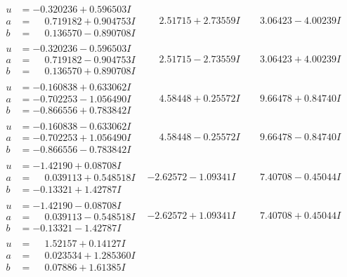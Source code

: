 \documentclass[1p]{elsarticle_modified}
\theoremstyle{definition}
\begin{document}
$$\begin{array}{c|c|c}
\begin{aligned}
u &= -0.320236 + 0.596503 I \\
a &= \phantom{-}0.719182 + 0.904753 I \\
b &= \phantom{-}0.136570 - 0.890708 I\end{aligned}
 & \phantom{-}2.51715 + 2.73559 I & \phantom{-}3.06423 - 4.00239 I \\ \hline\begin{aligned}
u &= -0.320236 - 0.596503 I \\
a &= \phantom{-}0.719182 - 0.904753 I \\
b &= \phantom{-}0.136570 + 0.890708 I\end{aligned}
 & \phantom{-}2.51715 - 2.73559 I & \phantom{-}3.06423 + 4.00239 I \\ \hline\begin{aligned}
u &= -0.160838 + 0.633062 I \\
a &= -0.702253 - 1.056490 I \\
b &= -0.866556 + 0.783842 I\end{aligned}
 & \phantom{-}4.58448 + 0.25572 I & \phantom{-}9.66478 + 0.84740 I \\ \hline\begin{aligned}
u &= -0.160838 - 0.633062 I \\
a &= -0.702253 + 1.056490 I \\
b &= -0.866556 - 0.783842 I\end{aligned}
 & \phantom{-}4.58448 - 0.25572 I & \phantom{-}9.66478 - 0.84740 I \\ \hline\begin{aligned}
u &= -1.42190 + 0.08708 I \\
a &= \phantom{-}0.039113 + 0.548518 I \\
b &= -0.13321 + 1.42787 I\end{aligned}
 & -2.62572 - 1.09341 I & \phantom{-}7.40708 - 0.45044 I \\ \hline\begin{aligned}
u &= -1.42190 - 0.08708 I \\
a &= \phantom{-}0.039113 - 0.548518 I \\
b &= -0.13321 - 1.42787 I\end{aligned}
 & -2.62572 + 1.09341 I & \phantom{-}7.40708 + 0.45044 I \\ \hline\begin{aligned}
u &= \phantom{-}1.52157 + 0.14127 I \\
a &= \phantom{-}0.023534 + 1.285360 I \\
b &= \phantom{-}0.07886 + 1.61385 I\end{aligned}

\end{array}$$
\end{document}
